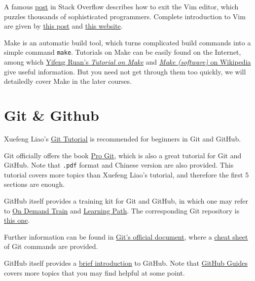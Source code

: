\documentclass[english]{../TexTemplate/thesis}
\begin{document}
A famous \href{https://stackoverflow.com/questions/11828270/how-to-exit-the-vim-editor}{post} in Stack Overflow describes how to exit the Vim editor, which puzzles thousands of sophisticated programmers. Complete introduction to Vim are given by \href{http://www.jianshu.com/p/bcbe916f97e1}{this post} and \href{https://blog.interlinked.org/tutorials/vim_tutorial.html}{this website}.

Make is an automatic build tool, which turns complicated build commands into a simple command \verb"make". Tutorials on Make can be easily found on the Internet, among which \href{http://www.ruanyifeng.com/blog/2015/02/make.html}{Yifeng Ruan's \emph{Tutorial on Make}} and \href{https://en.wikipedia.org/wiki/Make_(software)}{\emph{Make (software)} on Wikipedia} give useful information.
But you need not get through them too quickly, we will detailedly cover Make in the later courses.

\section{Git \& Github}
Xuefeng Liao's \href{https://www.liaoxuefeng.com/wiki/0013739516305929606dd18361248578c67b8067c8c017b000/}{Git Tutorial} is recommended for beginners in Git and GitHub.

Git officially offers the book \href{https://git-scm.com/book/en/v2}{Pro Git}, which is also a great tutorial for Git and GitHub. Note that \verb".pdf" format and Chinese version are also provided. This tutorial covers more topics than Xuefeng Liao's tutorial, and therefore the first 5 sections are enough.

GitHub itself provides a training kit for Git and GitHub, in which one may refer to \href{https://services.github.com/on-demand/}{On Demand Train} and \href{https://services.github.com/on-demand/resources/learning-path/}{Learning Path}. The corresponding Git repository is \href{https://github.com/github/training-kit}{this one}.

Further information can be found in \href{https://git-scm.com/doc}{Git's official document}, where a \href{https://services.github.com/on-demand/downloads/github-git-cheat-sheet.pdf}{cheat sheet} of Git commands are provided.

GitHub itself provides a \href{https://guides.github.com/activities/hello-world/}{brief introduction} to GitHub. Note that \href{https://guides.github.com/}{GitHub Guides} covers more topics that you may find helpful at some point.
\end{document}
